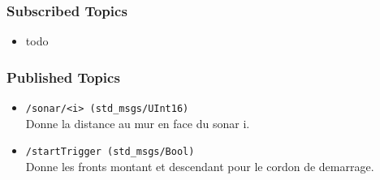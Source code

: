 \documentclass[a4paper, 11pt]{article}
\begin{document}
\subsubsection{Subscribed Topics}

\begin{itemize}
\item  todo
\end{itemize}

\subsubsection{Published Topics}

\begin{itemize}
\item \texttt{/sonar/<i> (std\_msgs/UInt16)}\\
  Donne la distance au mur en face du sonar i.
\item \texttt{/startTrigger (std\_msgs/Bool)}\\ 
  Donne les fronts montant et descendant pour le cordon de demarrage.
\end{itemize}
\end{document}
